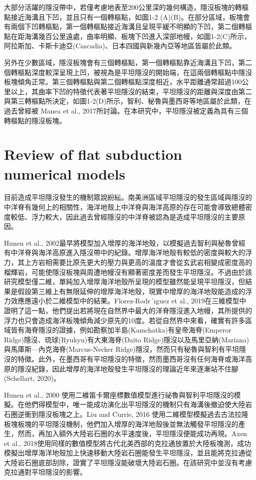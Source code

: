 大部分活躍的隱沒帶中，若僅考慮地表至200公里深的幾何構造，隱沒板塊的轉樞點接近海溝且下凹，並且只有一個轉樞點，如圖1-2 (A)(B)。在部分區域，板塊會有兩個下凹轉樞點，第一個轉樞點接近海溝且呈現平緩不明顯的下凹，第二個轉樞點在距海溝幾百公里遠處，曲率明顯、板塊下凹進入深部地幔，如圖1-2(C)所示，阿拉斯加、卡斯卡迪亞(Cascadia)、日本四國與新幾內亞等地區皆屬於此類。

另外在少數區域，隱沒板塊會有三個轉樞點，第一個轉樞點靠近海溝且下凹，第二個轉樞點深度較深呈現上凹，被視為是平坦隱沒的開始端，在這兩個轉樞點中隱沒板塊傾角正常。第三個轉樞點與第二個轉樞點深度相近，水平距離通常超過100公里以上，其曲率下凹的特徵代表著平坦隱沒的結束，平坦隱沒的距離與深度由第二與第三轉樞點所決定，如圖1-2(D)所示，智利、秘魯與墨西哥等地區屬於此類，在過去曾經被 Manea et al., 2017所討論。在本研究中，平坦隱沒被定義為具有三個轉樞點的隱沒板塊。

\section{Review of flat subduction numerical models}

目前造成平坦隱沒發生的機制眾說紛紜。南美洲區域平坦隱沒的發生區域與隱沒的中洋脊有幾何上的相關性，海洋地殼上中洋脊與海洋高原的存在可能會導致總體密度較低、浮力較大，因此過去曾經隱沒的中洋脊被認為是造成平坦隱沒的主要原因。

Hunen et al., 2002最早將模型加入增厚的海洋地殼，以模擬過去智利與秘魯曾經有中洋脊與海洋高原進入隱沒帶中的紀錄。增厚海洋地殼有較低的密度與較大的浮力，其上方岩相需要比原先更大的壓力與更高的溫度才會從玄武岩相變成密度高的榴輝岩，可能使隱沒板塊與周遭地幔沒有顯著密度差而發生平坦隱沒。不過由於該研究模型僅二維，單純加入增厚海洋地殼所呈現的模型雖然能呈現平坦隱沒，但結果是假設第三維上有無限延伸的增厚海洋地殼，現實中增厚的海洋地殼能造成的浮力效應應遠小於二維模型中的結果。Florez-Rodr´ıguez et al., 2019在三維模型中證明了這一點，他們提出若將現在自然界中最大的洋脊隱沒進入地幔，其所提供的浮力也只會造成海洋板塊傾角減少原先的10度。若從自然界中來看，確實有許多區域皆有海脊隱沒的證據，例如勘察加半島(Kamchatka)有皇帝海脊(Emperor Ridge)隱沒、琉球(Ryukyu)有大東海脊(Daito Ridge)隱沒以及馬里亞納(Mariana)與馬庫斯—內克海脊(Marcus-Necker Ridge)隱沒，然而只有秘魯與智利有平坦隱沒的特徵。此外，在墨西哥有平坦隱沒的特徵，然而墨西哥沒有任何海脊或海洋高原的隱沒紀錄，因此增厚的海洋地殼發生平坦隱沒的理論近年來逐漸站不住腳(Schellart, 2020)。

Hunen et al., 2000 使用二維笛卡爾座標數值模型進行祕魯與智利平坦隱沒的模擬。在他們得模型中，唯一能成功演化出平坦隱沒的機制只有海溝後撤迫使大陸岩石圈逆衝到隱沒板塊之上。Liu and Currie, 2016 使用二維模型模擬過去古法拉隆板塊板塊的平坦隱沒機制，他們加入增厚的海洋地殼後並無法觸發平坦隱沒的產生，然而，再加入額外大陸岩石圈的水平速度後，平坦隱沒便能成功再現。Axen et al., 2018使用同樣的數值模型將古代北美西部的克拉通放置於大陸板塊測，成功模擬出增厚海洋地殼加上快速移動大陸岩石圈能發生平坦隱沒，並且能將克拉通從大陸岩石圈底部刮除，證實了平坦隱沒能破壞大陸岩石圈。在該研究中並沒有考慮克拉通對平坦隱沒的影響。


